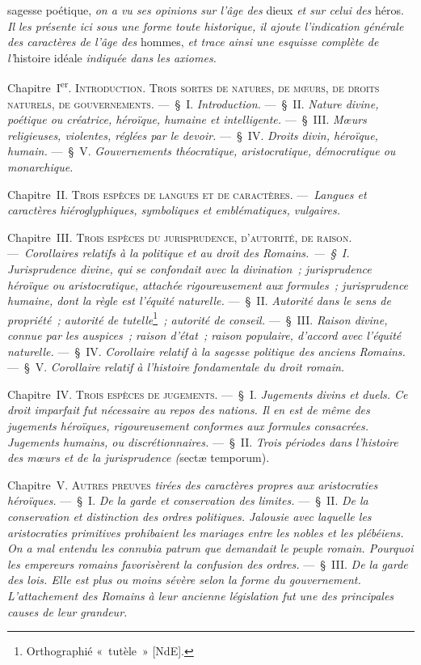 \documentclass[french,twoside]{book} %
\newcommand\chaptercont{} %
\begin{document}
\chaptercont
{} sagesse poétique, {\itshape on a vu ses opinions sur l’âge des} dieux {\itshape et sur celui des} héros. {\itshape Il les présente ici sous une forme toute historique, il ajoute l’indication générale des caractères de l’âge des} hommes, {\itshape et trace ainsi une esquisse complète de l’}histoire idéale {\itshape indiquée dans les axiomes.}\par
Chapitre I\textsuperscript{er}. {\scshape Introduction. Trois sortes de natures, de mœurs, de droits naturels, de gouvernements}. — § I. {\itshape Introduction.} — § II. {\itshape Nature divine, poétique ou créatrice, héroïque, humaine et intelligente.} — § III. {\itshape Mœurs religieuses, violentes, réglées par le devoir.} — § IV. {\itshape Droits divin, héroïque, humain.} — § V. {\itshape Gouvernements théocratique, aristocratique, démocratique ou monarchique.}\par
Chapitre {\scshape II. Trois espèces de langues et de caractères.} — {\itshape Langues et caractères hiéroglyphiques, symboliques et emblématiques, vulgaires.}\par
Chapitre {\scshape III. Trois espèces du jurisprudence, d’autorité, de raison.} — {\itshape Corollaires relatifs à la}  {\itshape politique et au droit des Romains. — § I. Jurisprudence divine, qui se confondait avec la divination ; jurisprudence héroïque ou aristocratique, attachée rigoureusement aux formules ; jurisprudence humaine, dont la règle est l’équité naturelle.} — § II. {\itshape Autorité dans le sens de propriété ; autorité de tutelle}\footnote{Orthographié « tutèle » [NdE].}{\itshape  ; autorité de conseil.} — § III. {\itshape Raison divine, connue par les auspices ; raison d’état ; raison populaire, d’accord avec l’équité naturelle.} — § IV. {\itshape Corollaire relatif à la sagesse politique des anciens Romains.} — § V. {\itshape Corollaire relatif à l’histoire fondamentale du droit romain.}\par
Chapitre {\scshape IV. Trois espèces de jugements}. — § I. {\itshape Jugements divins et duels. Ce droit imparfait fut nécessaire au repos des nations. Il en est de même des jugements héroïques, rigoureusement conformes aux formules consacrées. Jugements humains, ou discrétionnaires.} — § II. {\itshape Trois périodes dans l’histoire des mœurs et de la jurisprudence (}sectæ temporum).\par
Chapitre {\scshape V. Autres preuves} {\itshape tirées des caractères propres aux aristocraties héroïques.} — § I. {\itshape De la garde et conservation des limites.} — § II. {\itshape De la conservation et distinction des ordres politiques. Jalousie avec laquelle les aristocraties primitives prohibaient les mariages entre les nobles et les plébéiens. On a mal entendu les connubia patrum que demandait le peuple romain. Pourquoi les empereurs romains favorisèrent la confusion des ordres.} — § III. {\itshape De la garde}  {\itshape des lois. Elle est plus ou moins sévère selon la forme du gouvernement. L’attachement des Romains à leur ancienne législation fut une des principales causes de leur grandeur.}\par
\end{document}
